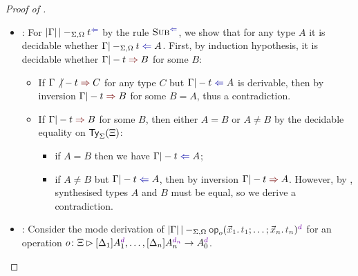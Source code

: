 \begin{proof}[Proof of {}]
\begin{itemize}
    \item {}: For $\erase{\Gamma} |-_{\Sigma, \Omega}t^{\chk}$ by the rule $\ChkRule{Sub}$, we show that for any type $A$ it is decidable whether $\Gamma |-_{\Sigma, \Omega} t \chk A$.
      First, by induction hypothesis, it is decidable whether $\Gamma |- t \syn B$ for some $B$:
      \begin{itemize}
        \item If $\Gamma \not|- t \syn C$ for any type $C$ but $\Gamma |- t \chk A$ is derivable, then by inversion $\Gamma |- t \syn B$ for some $B = A$, thus a contradiction.
        \item If $\Gamma |- t \syn B$ for some $B$, then either $A = B$ or $A \neq B$ by the decidable equality on $\mathsf{Ty}_{\Sigma}(\Xi)$: 
          \begin{itemize}
            \item if $A = B$ then we have\/ $\Gamma |- t \chk A$;
            \item if $A \neq B$ but $\Gamma |- t \chk A$, then by inversion $\Gamma |- t \syn A$.
              However, by , synthesised types $A$ and $B$ must be equal, so we derive a contradiction.
          \end{itemize}
      \end{itemize}
    \item {}:
      Consider the mode derivation of\/ $\erase{\Gamma} |-_{\Sigma, \Omega} \tmOpts^{\dir{d}}$ for an operation $o\colon \Xi \rhd [\Delta_{1}] A_{1}^{\dir{d}}, \ldots, [\Delta_n]A_{n}^{\dir{d_n}} \to A_0^{\dir{d}}$.
%
%
  \end{itemize}
\end{proof}

